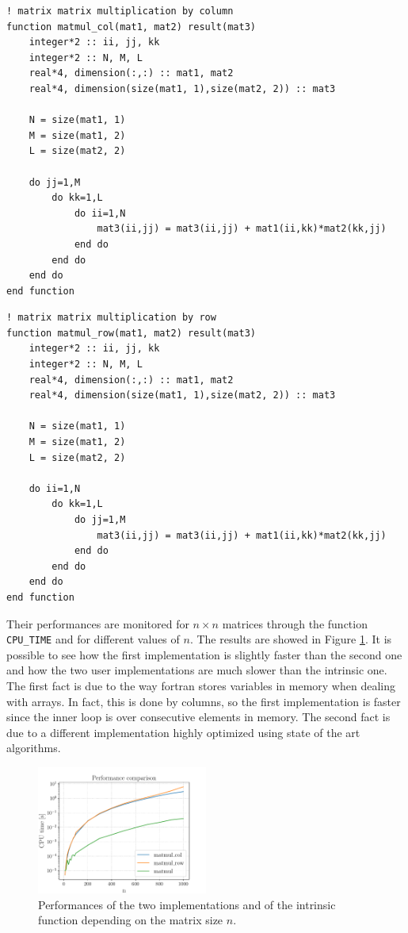 \documentclass[a4paper]{article}
\begin{document}
\begin{lstlisting}[label={lst:01_ex3_1},caption={First implementation of matrix matrix multiplication.}]
! matrix matrix multiplication by column
function matmul_col(mat1, mat2) result(mat3)
	integer*2 :: ii, jj, kk
	integer*2 :: N, M, L
	real*4, dimension(:,:) :: mat1, mat2
	real*4, dimension(size(mat1, 1),size(mat2, 2)) :: mat3

	N = size(mat1, 1)
	M = size(mat1, 2)
	L = size(mat2, 2)

	do jj=1,M
		do kk=1,L
			do ii=1,N
				mat3(ii,jj) = mat3(ii,jj) + mat1(ii,kk)*mat2(kk,jj)
			end do
		end do
	end do
end function
\end{lstlisting}

\begin{lstlisting}[label={lst:01_ex3_2},caption={Second implementation of matrix matrix multiplication.}]
! matrix matrix multiplication by row
function matmul_row(mat1, mat2) result(mat3)
	integer*2 :: ii, jj, kk
	integer*2 :: N, M, L
	real*4, dimension(:,:) :: mat1, mat2
	real*4, dimension(size(mat1, 1),size(mat2, 2)) :: mat3

	N = size(mat1, 1)
	M = size(mat1, 2)
	L = size(mat2, 2)

	do ii=1,N
		do kk=1,L
			do jj=1,M
				mat3(ii,jj) = mat3(ii,jj) + mat1(ii,kk)*mat2(kk,jj)
			end do
		end do
	end do
end function
\end{lstlisting}

Their performances are monitored for \( n \times n \) matrices through the function \texttt{CPU\_TIME} and for different values of \( n \). The results are showed in Figure \ref{fig:01_ex3_1}. It is possible to see how the first implementation is slightly faster than the second one and how the two user implementations are much slower than the intrinsic one. The first fact is due to the way fortran stores variables in memory when dealing with arrays. In fact, this is done by columns, so the first implementation is faster since the inner loop is over consecutive elements in memory. The second fact is due to a different implementation highly optimized using state of the art algorithms.

\begin{figure}[!h]
	\centering
	\includegraphics[width=0.5\textwidth]{images/01_ex3_performance.pdf}
	\caption{\label{fig:01_ex3_1} Performances of the two implementations and of the intrinsic function depending on the matrix size \( n \).}
\end{figure}
\end{document}
